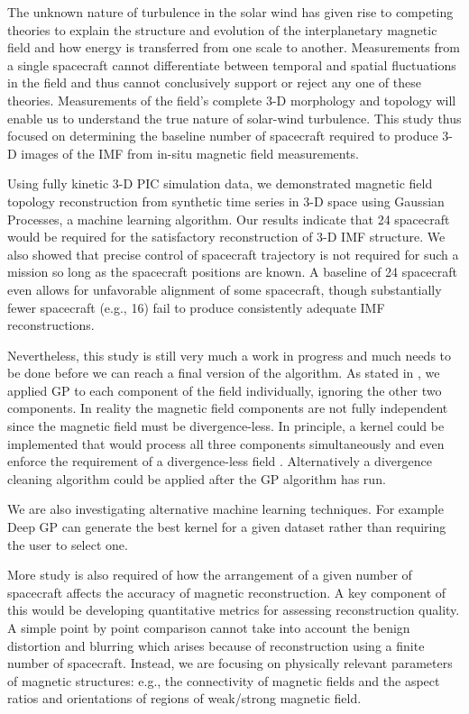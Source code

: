         The unknown nature of turbulence in the solar wind has given rise to competing theories to
        explain the structure and evolution of the interplanetary magnetic field and how energy is
        transferred from one scale to another. Measurements from a single spacecraft cannot
        differentiate between temporal and spatial fluctuations in the field and thus cannot
        conclusively support or reject any one of these theories. Measurements of the field's
        complete 3-D morphology and topology will enable us to understand the true nature of
        solar-wind turbulence. This study thus focused on determining the baseline number of
        spacecraft required to produce 3-D images of the IMF from in-situ magnetic field
        measurements.

        Using fully kinetic 3-D PIC simulation data, we demonstrated magnetic field topology
        reconstruction from synthetic time series in 3-D space using Gaussian Processes, a machine
        learning algorithm. Our results indicate that 24 spacecraft would be required for the
        satisfactory reconstruction of 3-D IMF structure. We also showed that precise control of
        spacecraft trajectory is not required for such a mission so long as the spacecraft positions
        are known. A baseline of 24 spacecraft even allows for unfavorable alignment of some
        spacecraft, though substantially fewer spacecraft (e.g., 16) fail to produce consistently
        adequate IMF reconstructions.

        Nevertheless, this study is still very much a work in progress and much needs to be done
        before we can reach a final version of the algorithm. As stated in , we
        applied GP to each component of the field individually, ignoring the other two components.
        In reality the magnetic field components are not fully independent since the magnetic field
        must be divergence-less.  In principle, a kernel could be implemented that would process all
        three components simultaneously and even enforce the requirement of a divergence-less field
        \citep[for a 2-D example of this, see][]{Narcowich2007,Wahlstroem2013}.  Alternatively a
        divergence cleaning algorithm could be applied after the GP algorithm has run. 
        
        We are also investigating alternative machine learning techniques. For example Deep GP
        \citep{Bui2016} can generate the best kernel for a given dataset rather than requiring the
        user to select one.

        More study is also required of how the arrangement of a given number of spacecraft affects
        the accuracy of magnetic reconstruction. A key component of this would be developing
        quantitative metrics for assessing reconstruction quality. A simple point by point
        comparison cannot take into account the benign distortion and blurring which arises because
        of reconstruction using a finite number of spacecraft. Instead, we are focusing on
        physically relevant parameters of magnetic structures: e.g., the connectivity of magnetic
        fields and the aspect ratios and orientations of regions of weak/strong magnetic field.